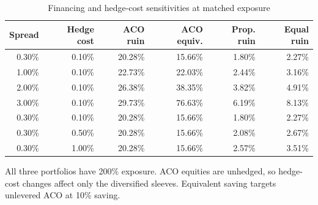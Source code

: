 \begin{table}[H]
\centering\small
\caption{Financing and hedge-cost sensitivities at matched exposure}\label{tab:aco-cost}
\begin{tabular}{rrrrrr}\toprule
Spread & Hedge cost & ACO ruin & ACO equiv. & Prop. ruin & Equal ruin \\
\midrule
0.30\% & 0.10\% & 20.28\% & 15.66\% & 1.80\% & 2.27\% \\
1.00\% & 0.10\% & 22.73\% & 22.03\% & 2.44\% & 3.16\% \\
2.00\% & 0.10\% & 26.38\% & 38.35\% & 3.82\% & 4.91\% \\
3.00\% & 0.10\% & 29.73\% & 76.63\% & 6.19\% & 8.13\% \\
0.30\% & 0.10\% & 20.28\% & 15.66\% & 1.80\% & 2.27\% \\
0.30\% & 0.50\% & 20.28\% & 15.66\% & 2.08\% & 2.67\% \\
0.30\% & 1.00\% & 20.28\% & 15.66\% & 2.57\% & 3.51\% \\
\bottomrule\end{tabular}
\par\smallskip\begin{minipage}{0.96\textwidth}\footnotesize
All three portfolios have 200\% exposure. ACO equities are unhedged, so hedge-cost changes affect only the diversified sleeves. Equivalent saving targets unlevered ACO at 10\% saving.
\end{minipage}\end{table}
